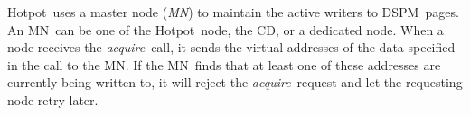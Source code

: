 \documentclass[sigconf]{acmart}
\newcommand{\DIFdelFL}[1]{}
\renewcommand{\em}{\it}
\newcommand{\acquire}{\textit{acquire}}
\newcommand{\dsnvm}{DSPM}
\newcommand{\nvm}{PM}
\newcommand{\hotpot}{Hotpot}
\newcommand{\mrmw}{MRMW}
\newcommand{\cd}{CD}
\newcommand{\on}{ON}
\newcommand{\dn}{DN}
\newcommand{\xn}{CN}
\newcommand{\master}{MN}
\providecommand{\DIFdel}[1]{{\protect\color{red}\sout{#1}}}                      %
\providecommand{\DIFdelbegin}{} %
\providecommand{\DIFdelFL}[1]{\DIFdel{#1}} %
\begin{document}
{
\hotpot\ uses a master node ({\em \master}) to maintain the active writers to \dsnvm\ pages. 
An \master\ can be one of the \hotpot\ node, the \cd, or a dedicated node.
When a node receives the \acquire\ call, it sends the virtual addresses of the data specified in the call to the \master.
If the \master\ finds that at least one of these addresses are currently being written to, 
it will reject the \acquire\ request and let the requesting node retry later.

\DIFdelbegin %
\DIFdelFL{Node }%
\DIFdelFL{\nvm }%
\DIFdelFL{Time }%
\DIFdelFL{Action }%
\DIFdelFL{any }%
\DIFdelFL{Y }%
\DIFdelFL{any }%
\DIFdelFL{resume normal operation after reboot }%
\DIFdelFL{\cd\ }%
\DIFdelFL{N }%
\DIFdelFL{any }%
\DIFdelFL{reconstruct using mirrored copy }%
\DIFdelFL{\on\ }%
\DIFdelFL{N }%
\DIFdelFL{NC }%
\DIFdelFL{promote an existing \dn\ to \on\ }%
\DIFdelFL{\dn\ }%
\DIFdelFL{N }%
\DIFdelFL{NC }%
\DIFdelFL{reconstruct data to meet replication degree }%
\DIFdelFL{\xn/\on\ }%
\DIFdelFL{N }%
\DIFdelFL{p1 }%
\DIFdelFL{undo commit, \on{}s delete redo logs }%
}
\end{document}
